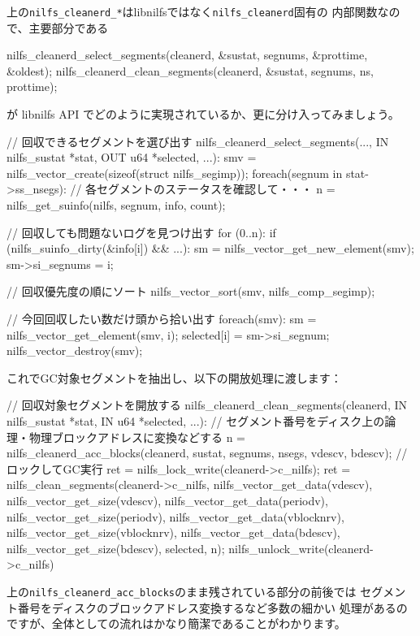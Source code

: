 \documentclass[mingoth,a4paper]{jsarticle}
\begin{document}
上の\verb|nilfs_cleanerd_*|はlibnilfsではなく\verb|nilfs_cleanerd|固有の
内部関数なので、主要部分である
\begin{commandline}
nilfs_cleanerd_select_segments(cleanerd, &sustat, segnums, &prottime, &oldest);
nilfs_cleanerd_clean_segments(cleanerd, &sustat, segnums, ns, prottime);
\end{commandline}
が libnilfs API でどのように実現されているか、更に分け入ってみましょう。

\begin{commandline}
// 回収できるセグメントを選び出す
nilfs_cleanerd_select_segments(..., IN nilfs_sustat *stat, OUT u64 *selected, ...):
    smv = nilfs_vector_create(sizeof(struct nilfs_segimp));
    foreach(segnum in stat->ss_nsegs):
        // 各セグメントのステータスを確認して・・・
        n = nilfs_get_suinfo(nilfs, segnum, info, count);

        // 回収しても問題ないログを見つけ出す
        for (0..n):
            if (nilfs_suinfo_dirty(&info[i]) && ...):
                sm = nilfs_vector_get_new_element(smv);
                sm->si_segnums = i;

        // 回収優先度の順にソート
        nilfs_vector_sort(smv, nilfs_comp_segimp);

        // 今回回収したい数だけ頭から拾い出す
        foreach(smv):
            sm = nilfs_vector_get_element(smv, i);
            selected[i] = sm->si_segnum;
    nilfs_vector_destroy(smv);
\end{commandline}

これでGC対象セグメントを抽出し、以下の開放処理に渡します：

\begin{commandline}
// 回収対象セグメントを開放する
nilfs_cleanerd_clean_segments(cleanerd, IN nilfs_sustat *stat, IN u64 *selected, ...):
    // セグメント番号をディスク上の論理・物理ブロックアドレスに変換などする
    n = nilfs_cleanerd_acc_blocks(cleanerd,
                                  sustat, segnums, nsegs, vdescv, bdescv);
    // ロックしてGC実行
    ret = nilfs_lock_write(cleanerd->c_nilfs);
    ret = nilfs_clean_segments(cleanerd->c_nilfs,
                               nilfs_vector_get_data(vdescv),
                               nilfs_vector_get_size(vdescv),
                               nilfs_vector_get_data(periodv),
                               nilfs_vector_get_size(periodv),
                               nilfs_vector_get_data(vblocknrv),
                               nilfs_vector_get_size(vblocknrv),
                               nilfs_vector_get_data(bdescv),
                               nilfs_vector_get_size(bdescv),
                               selected, n);
    nilfs_unlock_write(cleanerd->c_nilfs)
\end{commandline}
上の\verb|nilfs_cleanerd_acc_blocks|のまま残されている部分の前後では
セグメント番号をディスクのブロックアドレス変換するなど多数の細かい
処理があるのですが、全体としての流れはかなり簡潔であることがわかります。
\end{document}
